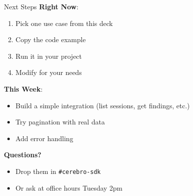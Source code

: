 \documentclass[aspectratio=169]{beamer}
\begin{document}
\begin{frame}{Next Steps}
\textbf{Right Now}:
\begin{enumerate}
  \item Pick one use case from this deck
  \item Copy the code example
  \item Run it in your project
  \item Modify for your needs
\end{enumerate}

\vspace{0.5cm}

\textbf{This Week}:
\begin{itemize}
  \item Build a simple integration (list sessions, get findings, etc.)
  \item Try pagination with real data
  \item Add error handling
\end{itemize}

\vspace{0.5cm}

\textbf{Questions?}
\begin{itemize}
  \item Drop them in \texttt{\#cerebro-sdk}
  \item Or ask at office hours Tuesday 2pm
\end{itemize}
\end{frame}
\end{document}
